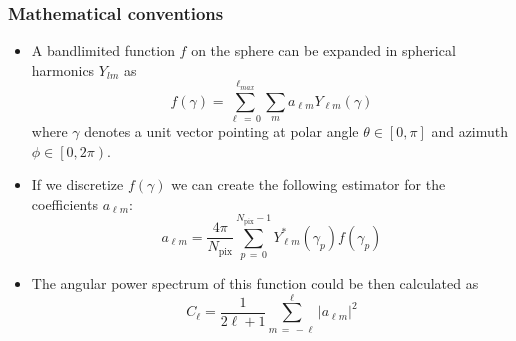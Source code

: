 \begin{frame}
\frametitle{Mathematical conventions}

\begin{itemize}
	\item<1-> A bandlimited function $f$ on the sphere can be expanded in spherical harmonics $Y_{lm}$ as
	\begin{equation*}
		f \left( \gamma \right)
		=
		\sum_{\ell\,=\,0}^{\ell_{max}} \sum_{m} a_{\ell m} Y_{\ell m} \left( \gamma \right)
	\end{equation*}
	where $\gamma$ denotes a unit vector pointing at polar angle $\theta \in \left[ 0, \pi \right]$ and azimuth $\phi \in \left[ 0, 2 \pi \right)$.
	\item<2-> If we discretize $f \left( \gamma \right)$ we can create the following estimator for the coefficients $a_{\ell m}$:
	\begin{equation*}
		a_{\ell m}
		=
		\frac{4 \pi}{N_{\text{pix}}} \sum_{p\,=\,0}^{N_{\text{pix}} - 1}
		Y_{\ell m}^{\ast} \left( \gamma_{p} \right) f \left( \gamma_{p} \right)
	\end{equation*}
	\item<3-> The angular power spectrum of this function could be then calculated as
	\begin{equation*}
		C_{\ell}
		=
		\frac{1}{2 \ell + 1} \sum_{m\,=\,-\ell}^{\ell} \left| a_{\ell m} \right|^{2}
	\end{equation*}
\end{itemize}

\end{frame}